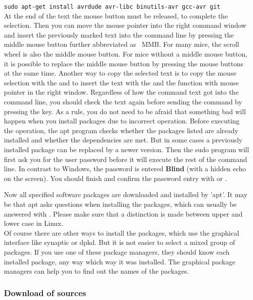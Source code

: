 \verb"sudo apt-get install avrdude avr-libc binutils-avr gcc-avr git"\\
At the end of the text the mouse button \LMB must be released,
to complete the selection.
Then you can move the mouse pointer into the right command window and
insert the previously marked text into the command line by pressing the
middle mouse button {further abbreviated as \ MMB}.
For many mice, the scroll wheel is also the middle mouse button.
For mice without a middle mouse button, it is possible to replace the middle mouse button
by pressing the \LRMB mouse buttons at the same time.
Another way to copy the selected text is to copy the mouse selection with the
 and to insert the text with the \RMB and the function 
 with mouse pointer in the right window.
Regardless of how the command text got into the command line,
you should check the text again before sending the command by pressing the \keys{\enter} key.
As a rule, you do not need to be afraid that something bad will happen when you install packages
due to incorrect operation.
Before executing the operation, the apt program checks whether the packages listed
are already installed and whether the dependencies are met.
But in some cases a previously installed package can be replaced by a newer version.
Then the sudo program will first ask you for the user password before it
will execute the rest of the command line.
In contrast to Windows, the password is entered \textbf{Blind} (with a hidden echo on the screen).
You should finish and confirm the password entry with \keys{\enter} or \keys{\return}. 

Now all specified software packages are downloaded and installed by 'apt'.
It may be that apt asks questions when installing the packages,
which can usually be answered with .
Please make sure that a distinction is made between upper and lower case in Linux.\\

Of course there are other ways to install the packages, which use the graphical interface
like synaptic or dpkd. But it is not easier to select a mixed group of packages.
If you use one of these package managers, they should know each installed package,
any way which way it was installed.
The graphical package managers can help you to find out the names of the packages.


\subsubsection{Download of sources}

